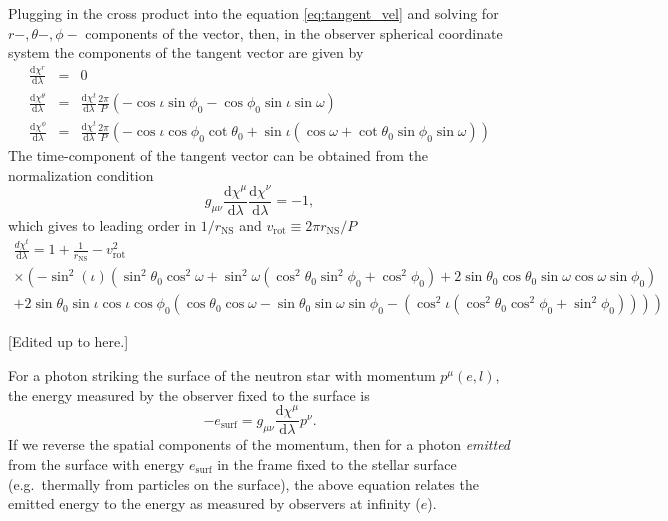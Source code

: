 \documentclass[modern]{aastex631}
\newcommand{\dd}{\mathrm{d}}
\newcommand{\rNS}{r_\mathrm{NS}}
\begin{document}
Plugging in the cross product into the equation \ref{eq:tangent_vel} and solving for $r-, \theta-, \phi-$ components of the vector, then, in the observer spherical coordinate system the components of the tangent vector
are given by 
\begin{eqnarray}
    \frac{\mathrm{d} \chi^r}{\mathrm{d} \lambda} & = & 0 \\
    \frac{\mathrm{d} \chi^\theta}{\mathrm{d} \lambda} & = & \frac{\mathrm{d} \chi^t}{\mathrm{d}\lambda} \frac{2\pi}{P} \left( - \cos\iota \sin \phi_0 - \cos\phi_0 \sin \iota \sin \omega \right) \\
    \frac{\mathrm{d} \chi^\phi}{\mathrm{d} \lambda} & = & \frac{\mathrm{d} \chi^t}{\mathrm{d}\lambda} \frac{2\pi}{P} \left( -\cos\iota \cos \phi_0 \cot \theta_0  + \sin \iota \left( \cos \omega + \cot \theta_0 \sin \phi_0 \sin \omega \right) \right)
\end{eqnarray}
The time-component of the tangent vector can be obtained from the normalization condition 
\begin{equation}
    g_{\mu \nu} \frac{\mathrm{d} \chi^\mu}{\mathrm{d} \lambda} \frac{\mathrm{d} \chi^\nu}{\mathrm{d} \lambda} = -1,
\end{equation}
which gives to leading order in $1/\rNS$ and $v_\mathrm{rot} \equiv 2 \pi \rNS / P$
\begin{multline}
    \frac{d \chi^t}{\mathrm{d} \lambda} = 1 + \frac{1}{\rNS} - v_\mathrm{rot}^2  \\ 
    \times \left( -\sin ^2(\iota ) \left(\sin ^2 \theta_0 \cos ^2 \omega +\sin ^2 \omega
    \left(\cos ^2 \theta_0 \sin ^2\phi_0 +\cos ^2 \phi_0 \right)+2 \sin \theta_0 \cos \theta_0 \sin \omega \cos
    \omega \sin \phi_0 \right) \right. \\ 
    \left. +2 \sin \theta_0 \sin \iota  \cos \iota \cos \phi_0 \left(\cos \theta_0 \cos\omega- \sin\theta_0\sin\omega\sin\phi_0
    -\left(\cos ^2\iota \left(\cos^2\theta_0\cos ^2\phi_0+\sin ^2\phi_0\right)\right) \right) \right)
\end{multline}

[Edited up to here.]

For a photon striking the surface of the neutron star with momentum $p^\mu\left(
e, l \right)$, the energy measured by the observer fixed to the surface is 
\begin{equation}
    -e_\mathrm{surf} = g_{\mu\nu} \frac{\dd \chi^\mu}{\dd \lambda} p^\nu.
\end{equation}
If we reverse the spatial components of the momentum, then for a photon
\emph{emitted} from the surface with energy $e_\mathrm{surf}$ in the frame fixed
to the stellar surface (e.g.\ thermally from particles on the surface), the
above equation relates the emitted energy to the energy as measured by observers
at infinity ($e$).
\end{document}
